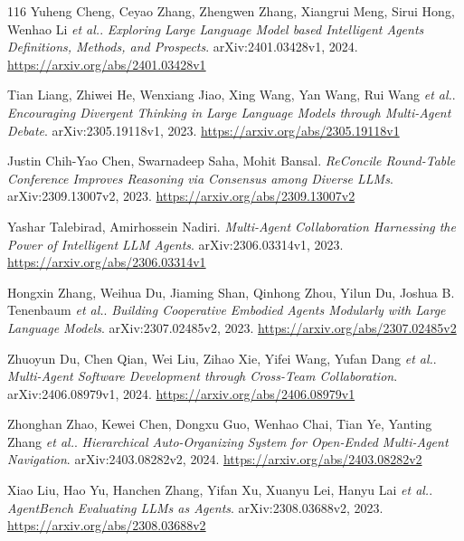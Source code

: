 \documentclass[11pt,a4paper]{article}
\begin{document}
\begin{thebibliography}{116}
Yuheng Cheng, Ceyao Zhang, Zhengwen Zhang, Xiangrui Meng, Sirui Hong, Wenhao Li \emph{et al.}.
\newblock \emph{Exploring Large Language Model based Intelligent Agents Definitions, Methods, and Prospects}.
\newblock arXiv:2401.03428v1, 2024.
\newblock \url{https://arxiv.org/abs/2401.03428v1}

Tian Liang, Zhiwei He, Wenxiang Jiao, Xing Wang, Yan Wang, Rui Wang \emph{et al.}.
\newblock \emph{Encouraging Divergent Thinking in Large Language Models through Multi-Agent Debate}.
\newblock arXiv:2305.19118v1, 2023.
\newblock \url{https://arxiv.org/abs/2305.19118v1}

Justin Chih-Yao Chen, Swarnadeep Saha, Mohit Bansal.
\newblock \emph{ReConcile Round-Table Conference Improves Reasoning via Consensus among Diverse LLMs}.
\newblock arXiv:2309.13007v2, 2023.
\newblock \url{https://arxiv.org/abs/2309.13007v2}

Yashar Talebirad, Amirhossein Nadiri.
\newblock \emph{Multi-Agent Collaboration Harnessing the Power of Intelligent LLM Agents}.
\newblock arXiv:2306.03314v1, 2023.
\newblock \url{https://arxiv.org/abs/2306.03314v1}

Hongxin Zhang, Weihua Du, Jiaming Shan, Qinhong Zhou, Yilun Du, Joshua B. Tenenbaum \emph{et al.}.
\newblock \emph{Building Cooperative Embodied Agents Modularly with Large Language Models}.
\newblock arXiv:2307.02485v2, 2023.
\newblock \url{https://arxiv.org/abs/2307.02485v2}

Zhuoyun Du, Chen Qian, Wei Liu, Zihao Xie, Yifei Wang, Yufan Dang \emph{et al.}.
\newblock \emph{Multi-Agent Software Development through Cross-Team Collaboration}.
\newblock arXiv:2406.08979v1, 2024.
\newblock \url{https://arxiv.org/abs/2406.08979v1}

Zhonghan Zhao, Kewei Chen, Dongxu Guo, Wenhao Chai, Tian Ye, Yanting Zhang \emph{et al.}.
\newblock \emph{Hierarchical Auto-Organizing System for Open-Ended Multi-Agent Navigation}.
\newblock arXiv:2403.08282v2, 2024.
\newblock \url{https://arxiv.org/abs/2403.08282v2}

Xiao Liu, Hao Yu, Hanchen Zhang, Yifan Xu, Xuanyu Lei, Hanyu Lai \emph{et al.}.
\newblock \emph{AgentBench Evaluating LLMs as Agents}.
\newblock arXiv:2308.03688v2, 2023.
\newblock \url{https://arxiv.org/abs/2308.03688v2}


\end{thebibliography}
\end{document}
